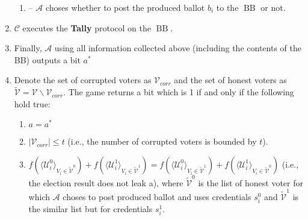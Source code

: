 \documentclass[12pt]{article}
\DeclareMathOperator{\bb}{BB}
\begin{document}
\begin{enumerate}
\begin{enumerate}
\item[] -- $\mathcal{A}$ choses whether to post the produced ballot $b_i$ to the $\bb$ or not. 
\end{enumerate}
\item $\mathcal{C}$ executes the \textbf{Tally} protocol on the $\bb$. 
\item Finally, $\mathcal{A}$ using all information collected above (including the contents of the BB) outputs a bit $a^*$
\item Denote the set of corrupted voters as $\mathcal{V}_{corr}$ and the set of honest voters as $\tilde{\mathcal{V}}= \mathcal{V} \backslash \mathcal{V}_{corr}$. The game returns a bit which is 1 if and only if the following hold true:
\begin{enumerate}
 \item $a = a^*$
 \item $|\mathcal{V}_{corr}| \leq t$ (i.e., the number of corrupted voters is bounded by $t$).
 \item $f(\langle \mathcal{U}^0_i \rangle _{V_i \in \tilde{\mathcal{V}}^0} ) + f(\langle \mathcal{U}^1_i \rangle _{V_i \in \tilde{\mathcal{V}}^1} ) =  f(\langle \mathcal{U}^0_i \rangle _{V_i \in \tilde{\mathcal{V}}^1} ) +  f(\langle \mathcal{U}^1_i \rangle _{V_i \in \tilde{\mathcal{V}}^0} )$ (i.e., the election result does not leak a), where  $ \tilde{\mathcal{V}}^0$ is the list of honest voter for which $\mathcal{A}$ choses to post produced ballot and uses credentials $s_i^0$  and $ \tilde{\mathcal{V}}^1$ is the similar list but for credentials $s_i^1$. 
  \end{enumerate} 
\end{enumerate}
\end{document}
